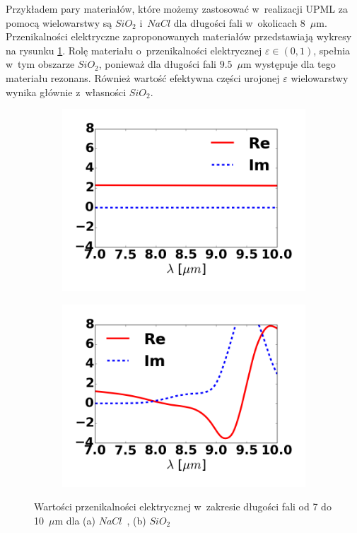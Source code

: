 Przykładem pary materiałów, które możemy zastosować w~realizacji UPML za pomocą wielowarstwy są $SiO_2$ i~$NaCl$ dla długości fali w~okolicach 8~$\mu$m. Przenikalności elektryczne zaproponowanych materiałów przedstawiają wykresy na rysunku \ref{fig:nacl-sio2-mat}. Rolę materiału o~przenikalności elektrycznej $\varepsilon \in (0,1)$, spełnia w~tym obszarze $SiO_2$, ponieważ dla długości fali $9.5$~$\mu$m występuje dla tego materiału rezonans. Również wartość efektywna części urojonej $\varepsilon$ wielowarstwy wynika głównie z~własności $SiO_2$. 

\begin{figure}[tb]
	\begin{subfigure}{0.45\textwidth}
		\includegraphics[width=\textwidth]{images/pml/nacl.png}
		\caption{}
	\end{subfigure}
	\begin{subfigure}{0.45\textwidth}
		\includegraphics[width=\textwidth]{images/pml/sio2.png}	
		\caption{}
	\end{subfigure}
	\caption{Wartości przenikalności elektrycznej w~zakresie długości fali od 7 do 10~$\mu$m dla (a) $NaCl$~\cite{li1976refractive}, (b) $SiO_2$~\cite{Kischkat:12}}
	\label{fig:nacl-sio2-mat}
\end{figure}

